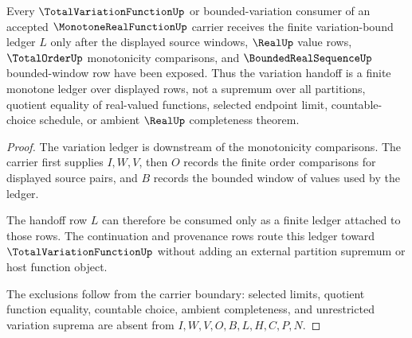\begin{theorem}
\label{thm:monotone-real-function-variation-ledger}
Every $\TotalVariationFunctionUp$ or bounded-variation consumer of an accepted $\MonotoneRealFunctionUp$ carrier receives the finite variation-bound ledger $L$ only after the displayed source windows, $\RealUp$ value rows, $\TotalOrderUp$ monotonicity comparisons, and $\BoundedRealSequenceUp$ bounded-window row have been exposed. Thus the variation handoff is a finite monotone ledger over displayed rows, not a supremum over all partitions, quotient equality of real-valued functions, selected endpoint limit, countable-choice schedule, or ambient $\RealUp$ completeness theorem.
\end{theorem}
\begin{proof}
The variation ledger is downstream of the monotonicity comparisons. The carrier first supplies $I,W,V$, then $O$ records the finite order comparisons for displayed source pairs, and $B$ records the bounded window of values used by the ledger.

The handoff row $L$ can therefore be consumed only as a finite ledger attached to those rows. The continuation and provenance rows route this ledger toward $\TotalVariationFunctionUp$ without adding an external partition supremum or host function object.

The exclusions follow from the carrier boundary: selected limits, quotient function equality, countable choice, ambient completeness, and unrestricted variation suprema are absent from $I,W,V,O,B,L,H,C,P,N$.
\end{proof}


\begin{closurestatus}{\MonotoneRealFunctionUp}
  \theoryclosure{\seedClosure}
  \formalstatus{\unformalizedV}
\end{closurestatus}
